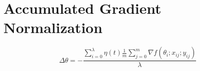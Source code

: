 %
%
%

\chapter{Accumulated Gradient Normalization}
\label{chapter:accumulated_gradient_normalization}

\begin{equation}
  \label{eq:accumulated_gradient_normalization}
  \Delta\theta = -\frac{\sum_{i = 0}^\lambda \eta(t) \frac{1}{m}\sum_{j = 0}^m \nabla f(\theta_i;x_{ij};y_{ij})}{\lambda}
\end{equation}
